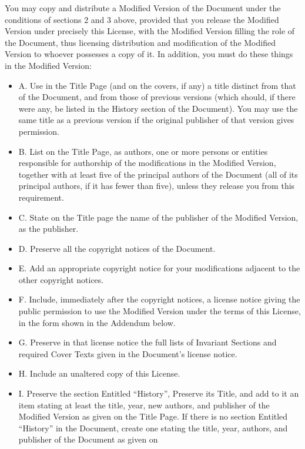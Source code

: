 You may copy and distribute a Modified Version of the Document under the
conditions of sections 2 and 3 above, provided that you release the
Modified Version under precisely this License, with the Modified Version
filling the role of the Document, thus licensing distribution and
modification of the Modified Version to whoever possesses a copy of it.
In addition, you must do these things in the Modified Version:

\begin{itemize}
\tightlist
\item
  A. Use in the Title Page (and on the covers, if any) a title distinct
  from that of the Document, and from those of previous versions (which
  should, if there were any, be listed in the History section of the
  Document). You may use the same title as a previous version if the
  original publisher of that version gives permission.
\item
  B. List on the Title Page, as authors, one or more persons or entities
  responsible for authorship of the modifications in the Modified
  Version, together with at least five of the principal authors of the
  Document (all of its principal authors, if it has fewer than five),
  unless they release you from this requirement.
\item
  C. State on the Title page the name of the publisher of the Modified
  Version, as the publisher.
\item
  D. Preserve all the copyright notices of the Document.
\item
  E. Add an appropriate copyright notice for your modifications adjacent
  to the other copyright notices.
\item
  F. Include, immediately after the copyright notices, a license notice
  giving the public permission to use the Modified Version under the
  terms of this License, in the form shown in the Addendum below.
\item
  G. Preserve in that license notice the full lists of Invariant
  Sections and required Cover Texts given in the Document's license
  notice.
\item
  H. Include an unaltered copy of this License.
\item
  I. Preserve the section Entitled ``History'', Preserve its Title, and
  add to it an item stating at least the title, year, new authors, and
  publisher of the Modified Version as given on the Title Page. If there
  is no section Entitled ``History'' in the Document, create one stating
  the title, year, authors, and publisher of the Document as given on

\end{itemize}
